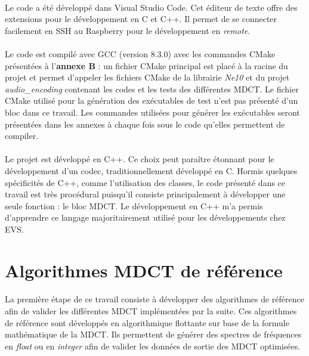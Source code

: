 \documentclass{article}
\begin{document}
    \paragraph{}
    Le code a été développé dans Visual Studio Code. Cet éditeur de texte offre des extensions pour le développement en C et C++. Il permet de se connecter facilement en SSH au Raspberry pour le développement en \emph{remote}.

    \paragraph{}
    Le code est compilé avec GCC (version 8.3.0) avec les commandes CMake présentées à l'\textbf{annexe B} : un fichier CMake principal est placé à la racine du projet et permet d'appeler les fichiers CMake de la librairie \emph{Ne10} et du projet \emph{audio\_encoding} contenant les codes et les tests des différentes MDCT. Le fichier CMake utilisé pour la génération des exécutables de test n'est pas présenté d'un bloc dans ce travail. Les commandes utilisées pour générer les exécutables seront présentées dans les annexes à chaque fois sous le code qu'elles permettent de compiler.

    \paragraph{}
    Le projet est développé en C++. Ce choix peut paraître étonnant pour le développement d'un codec, traditionnellement développé en C. Hormis quelques spécificités de C++, comme l'utilisation des classes, le code présenté dans ce travail est très procédural puisqu'il consiste principalement à développer une seule fonction : le bloc MDCT. Le développement en C++ m'a permis d'apprendre ce langage majoritairement utilisé pour les développements chez EVS.



    \newpage
    \section{Algorithmes MDCT de référence}

    \paragraph{}
    La première étape de ce travail consiste à développer des algorithmes de référence afin de valider les différentes MDCT implémentées par la suite. Ces algorithmes de référence sont développés en algorithmique flottante sur base de la formule mathématique de la MDCT. Ils permettent de générer des spectres de fréquences en \emph{float} ou en \emph{integer} afin de valider les données de sortie des MDCT optimisées.
\end{document}
